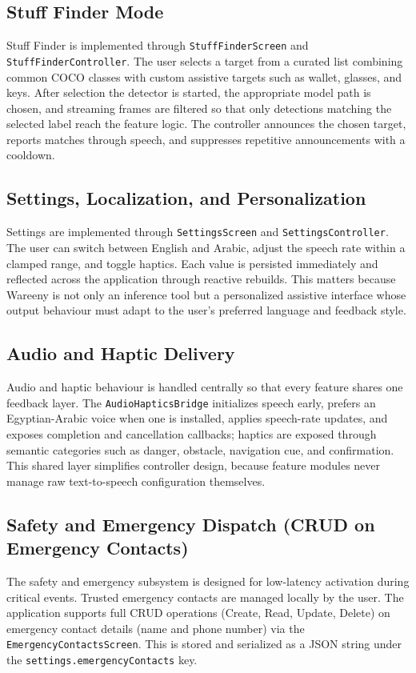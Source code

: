\documentclass[12pt,a4paper]{report}
\begin{document}
\subsection{Stuff Finder Mode}
Stuff Finder is implemented through \texttt{StuffFinderScreen} and \texttt{StuffFinderController}. The user selects a target from a curated list combining common COCO classes with custom assistive targets such as wallet, glasses, and keys. After selection the detector is started, the appropriate model path is chosen, and streaming frames are filtered so that only detections matching the selected label reach the feature logic. The controller announces the chosen target, reports matches through speech, and suppresses repetitive announcements with a cooldown.

\subsection{Settings, Localization, and Personalization}
Settings are implemented through \texttt{SettingsScreen} and \texttt{SettingsController}. The user can switch between English and Arabic, adjust the speech rate within a clamped range, and toggle haptics. Each value is persisted immediately and reflected across the application through reactive rebuilds. This matters because Wareeny is not only an inference tool but a personalized assistive interface whose output behaviour must adapt to the user's preferred language and feedback style.

\subsection{Audio and Haptic Delivery}
Audio and haptic behaviour is handled centrally so that every feature shares one feedback layer. The \texttt{AudioHapticsBridge} initializes speech early, prefers an Egyptian-Arabic voice when one is installed, applies speech-rate updates, and exposes completion and cancellation callbacks; haptics are exposed through semantic categories such as danger, obstacle, navigation cue, and confirmation. This shared layer simplifies controller design, because feature modules never manage raw text-to-speech configuration themselves.

\subsection{Safety and Emergency Dispatch (CRUD on Emergency Contacts)}
The safety and emergency subsystem is designed for low-latency activation during critical events. Trusted emergency contacts are managed locally by the user. The application supports full CRUD operations (Create, Read, Update, Delete) on emergency contact details (name and phone number) via the \texttt{EmergencyContactsScreen}. This is stored and serialized as a JSON string under the \texttt{settings.emergencyContacts} key.
\end{document}
